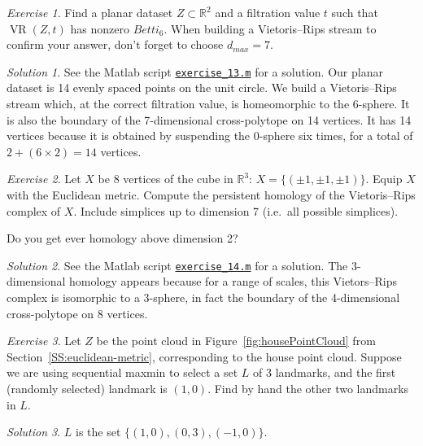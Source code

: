 \documentclass[amscd, amssymb, verbatim]{amsart}[12pt]
\theoremstyle{remark}
\theoremstyle{remark}
\newtheorem{exerciseSol}{Exercise}
\theoremstyle{remark}
\newtheorem*{solution}{Solution}
\DeclareMathOperator{\VR}{VR}
\newcommand{\R}{\mathbb{R}}
\begin{document}
\begin{exerciseSol}
Find a planar dataset $Z \subset \R^2$ and a filtration value $t$ such that $\VR(Z,t)$ has nonzero $Betti_6$. When building a Vietoris--Rips stream to confirm your answer, don't forget to choose $d_{max} = 7$.
\end{exerciseSol}

\begin{solution}
See the Matlab script \href{https://github.com/appliedtopology/javaplex/tree/master/src/matlab/for_distribution/tutorial_solutions/exercise_13.m}{\texttt{exercise\_13.m}} for a solution. Our planar dataset is 14 evenly spaced points on the unit circle. We build a Vietoris--Rips stream which, at the correct filtration value, is homeomorphic to the 6-sphere. It is also the boundary of the 7-dimensional cross-polytope on 14 vertices. It has 14 vertices because it is obtained by suspending the 0-sphere six times, for a total of $2 + (6 \times 2) = 14$ vertices. 
\end{solution}

\begin{exerciseSol}
Let $X$ be 8 vertices of the cube in $\R^3$: $X=\{(\pm1, \pm1, \pm1)\}$. Equip $X$ with the Euclidean metric. Compute the persistent homology of the Vietoris--Rips complex of $X$. Include simplices up to dimension 7 (i.e.\ all possible simplices).

Do you get ever homology above dimension 2?
\end{exerciseSol}

\begin{solution}
See the Matlab script \href{https://github.com/appliedtopology/javaplex/tree/master/src/matlab/for_distribution/tutorial_solutions/exercise_14.m}{\texttt{exercise\_14.m}} for a solution. The 3-dimensional homology appears because for a range of scales, this Vietors--Rips complex is isomorphic to a 3-sphere, in fact the boundary of the 4-dimensional cross-polytope on 8 vertices.
\end{solution}

\begin{exerciseSol}
Let $Z$ be the point cloud in Figure~\ref{fig:housePointCloud} from Section~\ref{SS:euclidean-metric}, corresponding to the house point cloud. Suppose we are using sequential maxmin to select a set $L$ of 3 landmarks, and the first (randomly selected) landmark is $(1,0)$. Find by hand the other two landmarks in $L$.
\end{exerciseSol}

\begin{solution}
$L$ is the set $\{(1, 0), (0, 3), (-1, 0)\}$. 
\end{solution}
\end{document}
